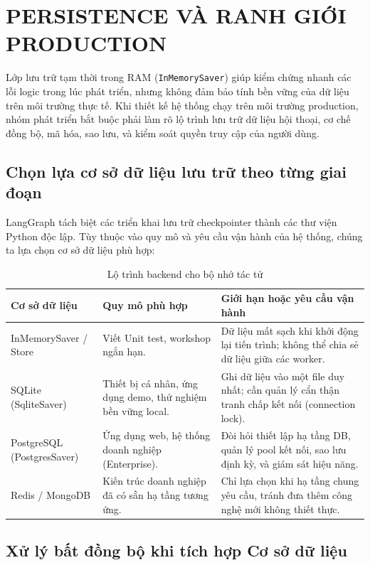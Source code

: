 \chapter{PERSISTENCE VÀ RANH GIỚI PRODUCTION}
\label{chap:production-persistence}

Lớp lưu trữ tạm thời trong RAM (\texttt{InMemorySaver}) giúp kiểm chứng nhanh các lỗi logic trong lúc phát triển, nhưng không đảm bảo tính bền vững của dữ liệu trên môi trường thực tế. Khi thiết kế hệ thống chạy trên môi trường production, nhóm phát triển bắt buộc phải làm rõ lộ trình lưu trữ dữ liệu hội thoại, cơ chế đồng bộ, mã hóa, sao lưu, và kiểm soát quyền truy cập của người dùng.

\section{Chọn lựa cơ sở dữ liệu lưu trữ theo từng giai đoạn}

LangGraph tách biệt các triển khai lưu trữ checkpointer thành các thư viện Python độc lập. Tùy thuộc vào quy mô và yêu cầu vận hành của hệ thống, chúng ta lựa chọn cơ sở dữ liệu phù hợp:

\begin{table}[H]
\centering
\caption{Lộ trình backend cho bộ nhớ tác tử}
\begin{tabular}{p{3.8cm}p{4.0cm}p{6.6cm}}
\toprule
\textbf{Cơ sở dữ liệu} & \textbf{Quy mô phù hợp} & \textbf{Giới hạn hoặc yêu cầu vận hành} \\
\midrule
InMemorySaver / Store & Viết Unit test, workshop ngắn hạn. & Dữ liệu mất sạch khi khởi động lại tiến trình; không thể chia sẻ dữ liệu giữa các worker. \\
SQLite (SqliteSaver) & Thiết bị cá nhân, ứng dụng demo, thử nghiệm bền vững local. & Ghi dữ liệu vào một file duy nhất; cần quản lý cẩn thận tranh chấp kết nối (connection lock). \\
PostgreSQL (PostgresSaver) & Ứng dụng web, hệ thống doanh nghiệp (Enterprise). & Đòi hỏi thiết lập hạ tầng DB, quản lý pool kết nối, sao lưu định kỳ, và giám sát hiệu năng. \\
Redis / MongoDB & Kiến trúc doanh nghiệp đã có sẵn hạ tầng tương ứng. & Chỉ lựa chọn khi hạ tầng chung yêu cầu, tránh đưa thêm công nghệ mới không thiết thực. \\
\bottomrule
\end{tabular}
\end{table}

\section{Xử lý bất đồng bộ khi tích hợp Cơ sở dữ liệu}


